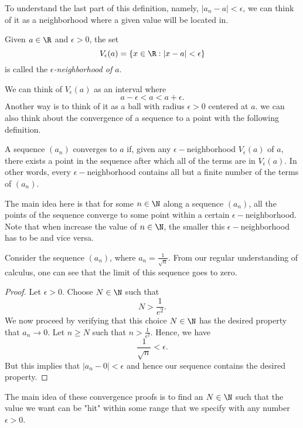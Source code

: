 To understand the last part of this definition, namely, \( |a_n - a| < \epsilon \), we can think of it as a neighborhood where a given value will be located in. 
\begin{definition}{}{}
Given \( a \in \R \) and \( \epsilon  > 0 \), the set 
\[ V_{  \epsilon }(a) = \{ x \in \R : |x-a| < \epsilon  \}\]
is called the \textit{\( \epsilon \)-neighborhood of \( a \)}. 
\end{definition}
We can think of \( V_{ \epsilon }(a)\) as an interval where 
\[ a - \epsilon < a < a + \epsilon.\]
Another way is to think of it as a ball with radius \( \epsilon > 0\) centered at \( a \). 
we can also think about the convergence of a sequence to a point with the following definition.
\begin{definition}{}{}
    A sequence \( (a_n) \) converges to \( a \) if, given any \( \epsilon-\)neighborhood \( V_{ \epsilon } (a)\) of \( a \), there exists a point in the sequence after which all of the terms are in \( V_{ \epsilon } (a) \). In other words, every \( \epsilon - \)neighborhood contains all but a finite number of the terms of \( (a_n) \). 
\end{definition}

The main idea here is that for some \( n \in \N \) along a sequence \( (a_n) \), all the points of the sequence converge to some point within a certain \( \epsilon -\)neighborhood. Note that when increase the value of \( n \in \N \), the smaller this \( \epsilon-\)neighborhood has to be and vice versa.

\begin{example}{}{}
Consider the sequence \( (a_n) \), where \( a_n = \frac{1}{ \sqrt{n} }\). From our regular understanding of calculus, one can see that the limit of this sequence goes to zero. 

\end{example}%
\begin{proof}
Let \( \epsilon  > 0 \). Choose \( N \in \N \) such that 
\[ N > \frac{1}{e^2}.\]
We now proceed by verifying that this choice \( N \in \N \) has the desired property that \( a_n \to 0 \). Let \( n \geq N \) such that \( n > \frac{1}{ \epsilon^2} \). Hence, we have 
\[ \frac{1}{ \sqrt{n}} < \epsilon. \]
But this implies that \( |a_n - 0| < \epsilon \) and hence our sequence contains the desired property. 
\end{proof}
The main idea of these convergence proofs is to find an \( N \in \N \) such that the value we want can be "hit" within some range that we specify with any number \( \epsilon > 0   \).


